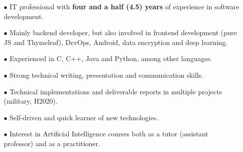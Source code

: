 \begin{itemize}

    \item[$\bullet$] IT professional with \textbf{four and a half (4.5) years} of experience in software development. 
    
    \item[$\bullet$] Mainly backend developer, but also involved in frontend development (pure JS and Thymeleaf), DevOps, Android, data encryption and deep learning. 
    
    \item[$\bullet$] Experienced in C, C++, Java and Python, among other languages.


    \item[$\bullet$] Strong technical writing, presentation and communication skills.
    
    \item[$\bullet$] Technical implementations and deliverable reports in multiple projects (military, H2020).

    \item[$\bullet$] Self-driven and quick learner of new technologies.

    \item[$\bullet$] Interest in Artificial Intelligence courses both as a tutor (assistant professor) and as a practitioner.

\end{itemize}